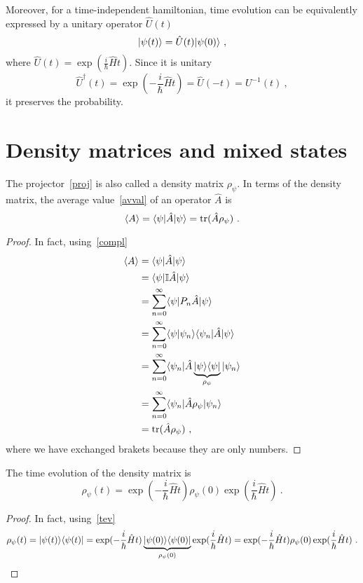     Moreover, for a time-independent hamiltonian, time evolution can be equivalently expressed by a unitary operator $\hat U(t)$  
    \begin{equation}\label{tev}
        \vert\psi(t)\rangle = \hat U(t) \vert\psi(0)\rangle ~,
    \end{equation}
    where $\hat U(t) = \exp (\frac{i}{\hbar} \hat H t)$. Since it is unitary 
    \begin{equation*}
        \hat U^\dagger (t) = \exp(- \frac{i}{\hbar} \hat H t) = \hat U(-t) = U^{-1} (t) ~,
    \end{equation*}
    it preserves the probability.

\section{Density matrices and mixed states}

    The projector~\eqref{proj} is also called a density matrix $\rho_\psi$. In terms of the density matrix, the average value~\eqref{avval} of an operator $\hat A$ is 
    \begin{equation*}
        \langle A\rangle = \langle\psi\vert \hat A \vert\psi\rangle = \operatorname{tr} (\hat A \rho_\psi) ~.
    \end{equation*}
    \begin{proof}
        In fact, using~\eqref{compl}
        \begin{equation*}
        \begin{aligned}
            \langle A\rangle & = \langle\psi\vert \hat A \vert\psi\rangle \\ & = \langle\psi\vert \mathbb I \hat A \vert\psi\rangle \\ & = \sum_{n=0}^{\infty} \langle\psi\vert P_n \hat A \vert\psi\rangle \\ & = \sum_{n=0}^{\infty} \langle\psi\vert\psi_n\rangle \langle\psi_n\vert \hat A \vert\psi\rangle \\ & = \sum_{n=0}^{\infty} \langle\psi_n\vert \hat A \underbrace{\vert\psi\rangle \langle\psi\vert}_{\rho_\psi} \vert\psi_n\rangle \\ & = \sum_{n=0}^{\infty} \langle\psi_n\vert \hat A \rho_\psi \vert\psi_n\rangle \\ & = \operatorname{tr} (\hat A \rho_\psi) ~,
        \end{aligned}
        \end{equation*}
        where we have exchanged brakets because they are only numbers.
    \end{proof}

    The time evolution of the density matrix is 
    \begin{equation*}
        \rho_\psi (t) = \exp(- \frac{i}{\hbar} \hat H t) \rho_\psi (0) \exp(\frac{i}{\hbar} \hat H t) ~.
    \end{equation*}
    \begin{proof}
        In fact, using~\eqref{tev}
        \begin{equation*}
            \rho_\psi (t) = \vert\psi(t)\rangle \langle\psi(t)\vert = \exp(- \frac{i}{\hbar} \hat H t) \underbrace{\vert\psi(0)\rangle \langle\psi(0)\vert}_{\rho_\psi (0)} \exp(\frac{i}{\hbar} \hat H t) = \exp(- \frac{i}{\hbar} \hat H t) \rho_\psi (0) \exp(\frac{i}{\hbar} \hat H t) ~.
        \end{equation*}
    \end{proof}

